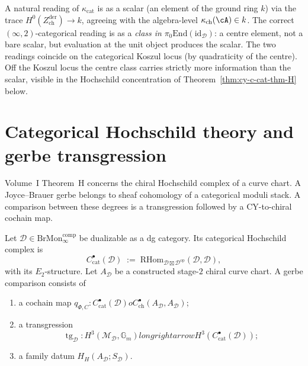 \begin{remark}
\label{rem:cy-c-cat-thm-D-kappa-scalar-or-morphism}
A natural reading of $\kappa_{\mathrm{cat}}$ is as a scalar (an
element of the ground ring $k$) via the trace
$H^0(Z^{\mathrm{der}}_{\mathrm{ch}}) \to k$, agreeing with the
algebra-level $\kappa_{\mathrm{ch}}(\cA) \in k$. The correct $(\infty,2)$-categorical
reading is as a \emph{class in} $\pi_0 \mathrm{End}(\mathrm{id}_{\mathcal D})$:
a centre element, not a bare scalar, but evaluation at the unit object
produces the scalar. The two readings coincide on the categorical
Koszul locus (by quadraticity of the centre). Off the Koszul locus
the centre class carries strictly more information than the scalar,
visible in the Hochschild concentration of
Theorem~\ref{thm:cy-c-cat-thm-H} below.
\end{remark}

\section{Categorical Hochschild theory and gerbe transgression}
\label{sec:cy-c-beyond-cat-thm-H}

Volume~I Theorem~H concerns the chiral Hochschild complex of a curve
chart.  A Joyce--Brauer gerbe belongs to sheaf cohomology of a
categorical moduli stack.  A comparison between these degrees is a
transgression followed by a CY-to-chiral cochain map.

\begin{definition}
\label{def:cy-c-cat-chir-hoch}
Let $\mathcal D \in \mathrm{BrMon}^{\mathrm{comp}}_\infty$ be
dualizable as a dg category.  Its categorical Hochschild complex is
\[
 C^\bullet_{\mathrm{cat}}(\mathcal D)
 \;:=\;
 \mathrm{RHom}_{\mathcal D \boxtimes \mathcal D^{\mathrm{op}}}(\mathcal D, \mathcal D),
\]
with its $E_2$-structure.  Let $A_\mathcal D$ be a constructed
stage-$2$ chiral curve chart.  A gerbe comparison consists of
\begin{enumerate}[label=\textup{(\roman*)}]
\item a cochain map
$q_{\Phi,C}\colon C^\bullet_{\mathrm{cat}}(\mathcal D)	o
C^\bullet_{\mathrm{ch}}(A_\mathcal D,A_\mathcal D)$;
\item a transgression
\[
 \operatorname{tg}_\mathcal D\colon
 H^3(\mathcal M_\mathcal D,\mathbb G_m)longrightarrow
 H^3(C^\bullet_{\mathrm{cat}}(\mathcal D));
\]
\item a family datum $H_H(A_\mathcal D;S_\mathcal D)$.
\end{enumerate}
\end{definition}

